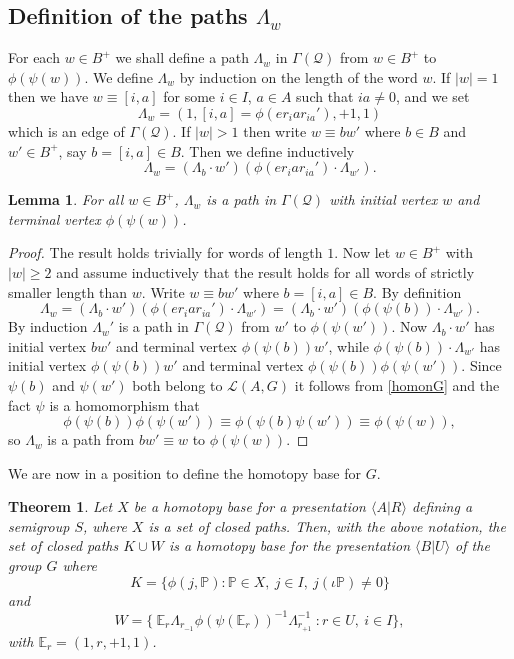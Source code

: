 \documentclass[11pt]{amsart}
\newtheorem{thm}{Theorem}
\newtheorem{lem}{Lemma}
\theoremstyle{plain}
\begin{document}
\subsection*{\boldmath Definition of the paths $\Lambda_w$} For each $w \in B^+$ we shall define a path $\Lambda_w$ in $\Gamma(\mathcal{Q})$ from $w \in B^+$ to $\phi ( \psi (w) )$. We define 
$\Lambda_w$ by induction on the length of the word $w$. If $|w|=1$ then we have $w \equiv [i,a]$ for some $i \in I$, $a \in A$ such that $ia \neq 0$, and we set
\[
\Lambda_w = (1, [i,a] = \phi(er_i a r_{ia}'), +1, 1)
\]
which is an edge of $\Gamma(\mathcal{Q})$. If $|w|>1$ then write $w \equiv bw'$ where $b \in B$ and $w' \in B^+$, say $b = [i,a] \in B$. Then we define inductively
\[
\Lambda_w = (\Lambda_b \cdot w')(\phi(er_i a r_{ia}') \cdot \Lambda_{w'}).
\]
\begin{lem}
For all $w \in B^+$, $\Lambda_w$ is a path in $\Gamma(\mathcal{Q})$ with initial vertex $w$ and terminal vertex $\phi (\psi(w))$.
\end{lem}
\begin{proof}
The result holds trivially for words of length $1$. Now let $w \in B^+$ with $|w| \geq 2$ and assume inductively that the result holds for all words of strictly smaller length than $w$. Write $w \equiv bw'$ where $b = [i,a] \in B$. By definition \[
\Lambda_w = (\Lambda_b \cdot w')(\phi(er_i a r_{ia}') \cdot \Lambda_{w'})
= (\Lambda_b \cdot w')(\phi(\psi(b)) \cdot \Lambda_{w'}).
\]
By induction $\Lambda_w'$ is a path in $\Gamma(\mathcal{Q})$ from $w'$ to $\phi (\psi (w'))$. Now $\Lambda_b \cdot w'$ has initial vertex $bw'$ and terminal vertex $\phi(\psi(b))w'$, while $\phi(\psi(b)) \cdot \Lambda_{w'}$ has initial vertex $\phi(\psi(b))w'$ and terminal vertex $\phi(\psi(b)) \phi (\psi (w'))$. Since $\psi(b)$ and $\psi(w')$ both belong to ${\mathcal{L}({A,G})}$ it follows from \eqref{homonG} and the fact $\psi$ is a homomorphism that
\[
\phi(\psi(b)) \phi(\psi(w')) \equiv \phi(\psi(b) \psi (w')) \equiv \phi(\psi(w)),
\]
so $\Lambda_w$ is a path from $bw' \equiv w$ to $\phi (\psi (w))$. \end{proof}

We are now in a position to define the homotopy base for $G$.

\begin{thm} \label{homotopybase}
Let  $X$ be a homotopy base for a presentation ${\langle} A | R {\rangle}$ defining a semigroup $S$, where $X$ is a set of closed paths. Then, with the above notation, the set of closed paths $K \cup W$ is a homotopy base for the presentation ${\langle} B | U {\rangle}$ of the group $G$ where
\[
K = \{ \phi(j, \mathbb{P}) : \mathbb{P} \in {X}, \ j \in I, \ j (\iota \mathbb{P}) \neq 0 \}
\]
and
\[
W = \{ \ {\mathbb{E}}_r \Lambda_{r_{-1}}  \phi(\psi({\mathbb{E}}_r))^{-1}  \Lambda_{r_{+1}}^{-1} \ : r \in U, \ i \in I \},
\]
with ${\mathbb{E}}_r = (1,r,+1,1)$. 
\end{thm}
\end{document}
